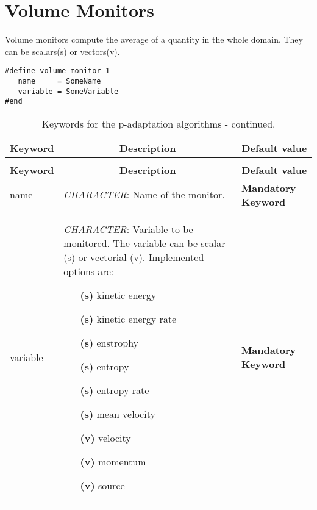 \documentclass[a4paper,10pt]{report}
\begin{document}
\section{Volume Monitors}
Volume monitors compute the average of a quantity in the whole domain. They can be scalars(s) or vectors(v).

\begin{lstlisting}
#define volume monitor 1
   name     = SomeName
   variable = SomeVariable
#end
\end{lstlisting}

\begin{longtable}{|p{4cm}|p{10cm}|p{2.2cm}|}
\caption{Keywords for volume monitors.} \label{tab:VolMonitorsKey} \\
\hline
\multicolumn{1}{|c|}{\textbf{Keyword}} & \multicolumn{1}{c|}{\textbf{Description}} & \multicolumn{1}{c|}{\textbf{Default value}} \\ \hline
\endfirsthead

\caption{Keywords for the p-adaptation algorithms - continued.} \\
\hline
\multicolumn{1}{|c|}{\textbf{Keyword}} & \multicolumn{1}{c|}{\textbf{Description}} & \multicolumn{1}{c|}{\textbf{Default value}} \\ \hline
\endhead

name 	&
			\textit{CHARACTER}: Name of the monitor. &
							\textbf{Mandatory Keyword} \\ \hline

variable 	&
			\textit{CHARACTER}: Variable to be monitored. The variable can be scalar (s) or vectorial (v). Implemented options are:\
\begin{multicols}{2}
\begin{itemize}
\item[\textbf{(s)}] kinetic energy
\item[\textbf{(s)}] kinetic energy rate
\item[\textbf{(s)}] enstrophy
\item[\textbf{(s)}] entropy
\item[\textbf{(s)}] entropy rate
\item[\textbf{(s)}] mean velocity
\item[\textbf{(v)}] velocity
\item[\textbf{(v)}] momentum
\item[\textbf{(v)}] source
\end{itemize}
\end{multicols}

			 &
							\textbf{Mandatory Keyword} \\ \hline


\end{longtable}
\end{document}
